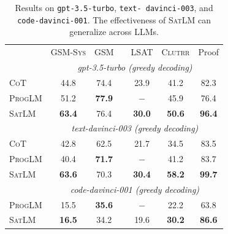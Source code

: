 \documentclass{article}
\theoremstyle{definition}
\newcommand\ttsmall[1]{\texttt{\small #1}}
\newcommand{\gsm}{\textsc{GSM}}
\newcommand{\gsmsys}{\textsc{GSM-Sys}}
\newcommand{\lsat}{\textsc{LSAT}}
\newcommand{\clutrr}{\textsc{Clutrr}}
\newcommand{\cotlm}{\textsc{CoT}}
\newcommand{\satlm}{\textsc{SatLM}}
\newcommand{\pallm}{\textsc{ProgLM}}
\begin{document}
\begin{table}
\vspace{-0.1in}
    \caption{Results on \ttsmall{gpt-3.5-turbo}, \ttsmall{text- davinci-003}, and \ttsmall{code-davinci-001}. The effectiveness of \satlm{} can generalize across LLMs. }
  \vspace{0.5em}
  \label{tab:other_llms}
  \scriptsize
  \renewcommand{\tabcolsep}{1.2mm}
  \centering
  \begin{tabular}{lcccccc}
    \toprule
         & \gsmsys{} & \gsm{} & & \lsat{} & \clutrr{} &{\sc Proof} \\
        \cmidrule{2-3}\cmidrule{5-7} 
        & \multicolumn{6}{c}{\it \footnotesize gpt-3.5-turbo (greedy decoding)}\vspace{0.05in}\\
        \cotlm{} & 44.8	& 74.4 &&  23.9	& 41.2 &	82.3\\
    \pallm{}   & 51.2	& \bf 77.9	&& 	$-$ & 45.9 &76.4\\
     \satlm{}    & \bf 63.4 & 76.4 && \bf 30.0 & \bf	50.6 & \bf 96.4 \\
        \cmidrule{2-3}\cmidrule{5-7} 
        & \multicolumn{6}{c}{\it \footnotesize text-davinci-003 (greedy decoding)}\vspace{0.05in}\\
    \cotlm{} & 42.8 & 62.5 && 21.7 & 34.5 & 83.5 \\
    \pallm{}   & 40.4 & \bf 71.7 && $-$  & 41.2 &   83.7 \\
     \satlm{}            & \bf 63.6 & 70.3 & & \bf 30.4 & \bf 58.2 & \bf 99.7 \\
        \cmidrule{2-3}\cmidrule{5-7} 
        & \multicolumn{6}{c}{\it \footnotesize code-davinci-001 (greedy decoding)}\vspace{0.05in}\\
    \pallm{}  & 15.5& \bf 35.6 & & $-$ & 22.2 &  63.8   \\
    \satlm{}   & \bf 16.5 & 34.2 & & 19.6 & \bf 30.2&  \bf 86.6  \\
    \bottomrule
 \end{tabular}
\vspace{-0.1in}
\end{table}
\end{document}
